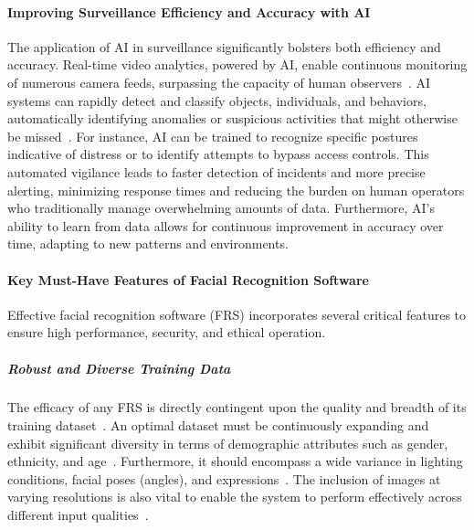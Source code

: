 \paragraph{Improving Surveillance Efficiency and Accuracy with AI}
The application of AI in surveillance significantly bolsters both efficiency and accuracy. Real-time video analytics, powered by AI, enable continuous monitoring of numerous camera feeds, surpassing the capacity of human observers~\cite{securityindustry_2025_transforming}. AI systems can rapidly detect and classify objects, individuals, and behaviors, automatically identifying anomalies or suspicious activities that might otherwise be missed~\cite{securityindustry_2025_transforming}. For instance, AI can be trained to recognize specific postures indicative of distress or to identify attempts to bypass access controls. This automated vigilance leads to faster detection of incidents and more precise alerting, minimizing response times and reducing the burden on human operators who traditionally manage overwhelming amounts of data. Furthermore, AI's ability to learn from data allows for continuous improvement in accuracy over time, adapting to new patterns and environments.

\paragraph{Key Must-Have Features of Facial Recognition Software}
Effective facial recognition software (FRS) incorporates several critical features to ensure high performance, security, and ethical operation.

\subparagraph{Robust and Diverse Training Data}
The efficacy of any FRS is directly contingent upon the quality and breadth of its training dataset~\cite{kairos_secret_2018, geeksforgeeks_dataset_2025}. An optimal dataset must be continuously expanding and exhibit significant diversity in terms of demographic attributes such as gender, ethnicity, and age~\cite{geeksforgeeks_dataset_2025}. Furthermore, it should encompass a wide variance in lighting conditions, facial poses (angles), and expressions~\cite{kairos_secret_2018}. The inclusion of images at varying resolutions is also vital to enable the system to perform effectively across different input qualities~\cite{geeksforgeeks_dataset_2025}.

